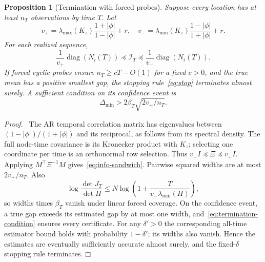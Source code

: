 \documentclass[11pt]{article}
\newtheorem{proposition}[theorem]{Proposition}
\newenvironment{proof}{\par\noindent\textit{Proof.}\ }{\hfill$\mdlgwhtsquare$\par\medskip}
\begin{document}
\begin{proposition}[Termination with forced probes]
Suppose every location has at least $n_T$ observations by time $T$. Let
\begin{equation}
v_+=\lambda_{\max}(K_z)\frac{1+|\phi|}{1-|\phi|}+r,
\quad v_-=\lambda_{\min}(K_z)\frac{1-|\phi|}{1+|\phi|}+r.
\label{eq:covariance-constants}
\end{equation}
For each realized sequence,
\begin{equation}
\frac1{v_+}\operatorname{diag}(N_i(T))\preceq\mathcal I_T
\preceq\frac1{v_-}\operatorname{diag}(N_i(T)).
\label{eq:info-sandwich}
\end{equation}
If forced cyclic probes ensure $n_T\ge cT-O(1)$ for a fixed $c>0$, and the true mean has a positive smallest gap, the stopping rule~\eqref{eq:stop} terminates almost surely. A sufficient condition on its confidence event is
\begin{equation}
\Delta_{\min}>2\beta_T\sqrt{2v_+/n_T}.
\label{eq:termination-condition}
\end{equation}
\end{proposition}
\begin{proof}
The AR temporal correlation matrix has eigenvalues between $(1-|\phi|)/(1+|\phi|)$ and its reciprocal, as follows from its spectral density. The full node-time covariance is its Kronecker product with $K_z$; selecting one coordinate per time is an orthonormal row selection. Thus $v_-I\preceq\Xi\preceq v_+I$. Applying $M^\top\Xi^{-1}M$ gives~\eqref{eq:info-sandwich}. Pairwise squared widths are at most $2v_+/n_T$. Also
\[
\log\frac{\det J_T}{\det H}
\le N\log\left(1+\frac{T}{v_-\lambda_{\min}(H)}\right),
\]
so widths times $\beta_T$ vanish under linear forced coverage. On the confidence event, a true gap exceeds its estimated gap by at most one width, and~\eqref{eq:termination-condition} ensures every certificate. For any $\delta'>0$ the corresponding all-time estimator bound holds with probability $1-\delta'$; its widths also vanish. Hence the estimates are eventually sufficiently accurate almost surely, and the fixed-$\delta$ stopping rule terminates.
\end{proof}
\end{document}
